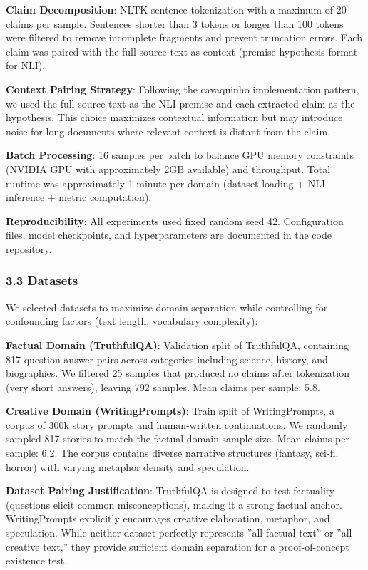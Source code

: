\textbf{Claim Decomposition}: NLTK sentence tokenization with a maximum of 20 claims per sample. Sentences shorter than 3 tokens or longer than 100 tokens were filtered to remove incomplete fragments and prevent truncation errors. Each claim was paired with the full source text as context (premise-hypothesis format for NLI).

\textbf{Context Pairing Strategy}: Following the cavaquinho implementation pattern, we used the full source text as the NLI premise and each extracted claim as the hypothesis. This choice maximizes contextual information but may introduce noise for long documents where relevant context is distant from the claim.

\textbf{Batch Processing}: 16 samples per batch to balance GPU memory constraints (NVIDIA GPU with approximately 2GB available) and throughput. Total runtime was approximately 1 minute per domain (dataset loading + NLI inference + metric computation).

\textbf{Reproducibility}: All experiments used fixed random seed 42. Configuration files, model checkpoints, and hyperparameters are documented in the code repository.

\subsubsection{3.3 Datasets}

We selected datasets to maximize domain separation while controlling for confounding factors (text length, vocabulary complexity):

\textbf{Factual Domain (TruthfulQA)}: Validation split of TruthfulQA, containing 817 question-answer pairs across categories including science, history, and biographies. We filtered 25 samples that produced no claims after tokenization (very short answers), leaving 792 samples. Mean claims per sample: 5.8.

\textbf{Creative Domain (WritingPrompts)}: Train split of WritingPrompts, a corpus of 300k story prompts and human-written continuations. We randomly sampled 817 stories to match the factual domain sample size. Mean claims per sample: 6.2. The corpus contains diverse narrative structures (fantasy, sci-fi, horror) with varying metaphor density and speculation.

\textbf{Dataset Pairing Justification}: TruthfulQA is designed to test factuality (questions elicit common misconceptions), making it a strong factual anchor. WritingPrompts explicitly encourages creative elaboration, metaphor, and speculation. While neither dataset perfectly represents ''all factual text'' or ''all creative text,'' they provide sufficient domain separation for a proof-of-concept existence test.

